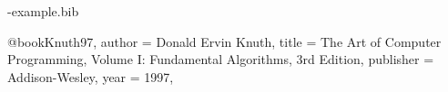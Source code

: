 \documentclass[twoside,openright]{scrreprt}
\begin{document}
\printbibliography[heading=bibintoc]

%
\begin{filecontents*}{\jobname-example.bib}

	@book{Knuth97,
	author    = {Donald Ervin Knuth},
	title     = {The Art of Computer Programming, Volume {I}: Fundamental Algorithms, 3rd Edition},
	publisher = {Addison-Wesley},
	year      = {1997},
	}

\end{filecontents*}
\end{document}
